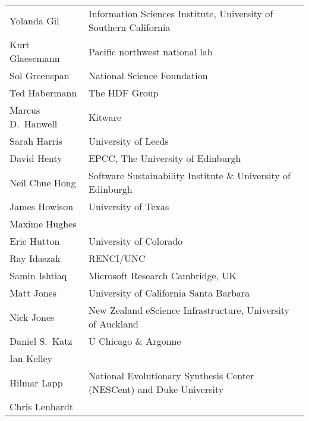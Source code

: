 \documentclass[11pt, oneside]{amsart}
\begin{document}
{\begin{longtable}{ll}
\\ Yolanda Gil           &  Information Sciences Institute, University of Southern California                    
\\ Kurt Glaesemann       &  Pacific northwest national lab                                                       
\\ Sol Greenspan         &  National Science Foundation                                                          
\\ Ted Habermann         &  The HDF Group                                                                        
\\ Marcus D.~Hanwell     &  Kitware                                                                              
\\ Sarah Harris          &  University of Leeds                                                                  
\\ David Henty           &  EPCC, The University of Edinburgh                                                    
\\ Neil Chue Hong        &  Software Sustainability Institute \& University of Edinburgh                         
\\ James Howison         &  University of Texas                                                                  
\\ Maxime Hughes         
\\ Eric Hutton           &  University of Colorado                                                               
\\ Ray Idaszak           &  RENCI/UNC                                                                            
\\ Samin Ishtiaq         &  Microsoft Research Cambridge, UK                                                     
\\ Matt Jones            &  University of California Santa Barbara                                               
\\ Nick Jones            &  New Zealand eScience Infrastructure, University of Auckland                          
\\ Daniel S.~Katz        &  U Chicago \& Argonne                                                                 
\\ Ian Kelley            
\\ Hilmar Lapp           &  National Evolutionary Synthesis Center (NESCent) and Duke University                 
\\ Chris Lenhardt        

\end{longtable}}
\end{document}
